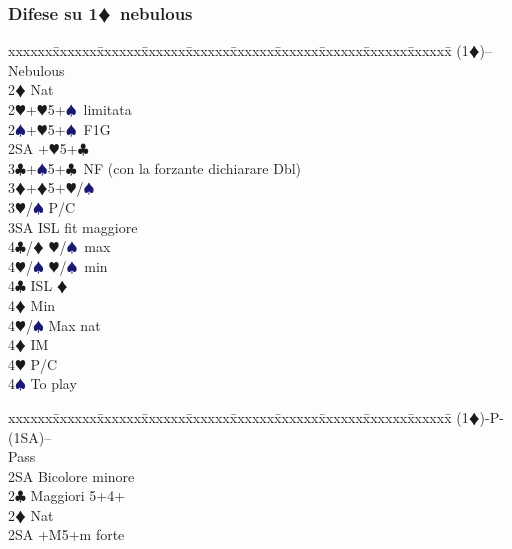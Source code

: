 \documentclass[a4paper,italian]{article}
\newcommand{\BC}{\textcolor{OliveGreen}{$\clubsuit$}}
\newcommand{\BD}{\textcolor{RedOrange}{$\vardiamondsuit$}}
\newcommand{\BH}{\textcolor{Red2}{$\varheartsuit${}}}
\newcommand{\BS}{\textcolor{MidnightBlue}{$\spadesuit${}}}
\newcommand{\pdfd}{\texorpdfstring{\BD{}}{D}}
\newenvironment{bidtable}
{\begin{tabbing}

    xxxxxx\=xxxxxx\=xxxxxx\=xxxxxx\=xxxxxx\=xxxxxx\=xxxxxx\=xxxxxx\=xxxxxx\=xxxxxx\=\kill}
{\end{tabbing} }%
\begin{document}
\begin{multicols}{2}
                                        \subsubsection{Difese su 1\pdfd\ nebulous}

                                        \begin{bidtable}
                                            (1\BD)-- \> Nebulous\+\\
                                            2\BD \> Nat\\
                                            2\BH {}+\BH 5+\BS\ limitata\\
                                            2\BS {}+\BH 5+\BS\ F1G\\
                                            2SA +\BH 5+\BC \\
                                            3\BC {}+\BS 5+\BC\ NF (con la forzante dichiarare Dbl)\\
                                            3\BD {}+\BD 5+\BH /\BS \+\\
                                            3\BH/\BS \> P/C\\
                                            3SA \> ISL fit maggiore\+\\
                                            4\BC/\BD \> \BH /\BS\ max\\
                                            4\BH/\BS \> \BH /\BS\ min\-\\
                                            4\BC \> ISL \BD \+\\
                                            4\BD \> Min\\
                                            4\BH/\BS \> Max nat\-\\
                                            4\BD \> IM\\
                                            4\BH \> P/C\\
                                            4\BS \> To play\-\-
                                        \end{bidtable}
                                        \begin{bidtable}
                                            (1\BD)-P-(1SA)--\+\\
                                            Pass\+\\
                                            2SA \> Bicolore minore\-\\
                                            2\BC \> Maggiori 5+4+\\
                                            2\BD \> Nat\\
                                            2SA +M5+m forte\-
                                        \end{bidtable}

\end{multicols}
\end{document}
